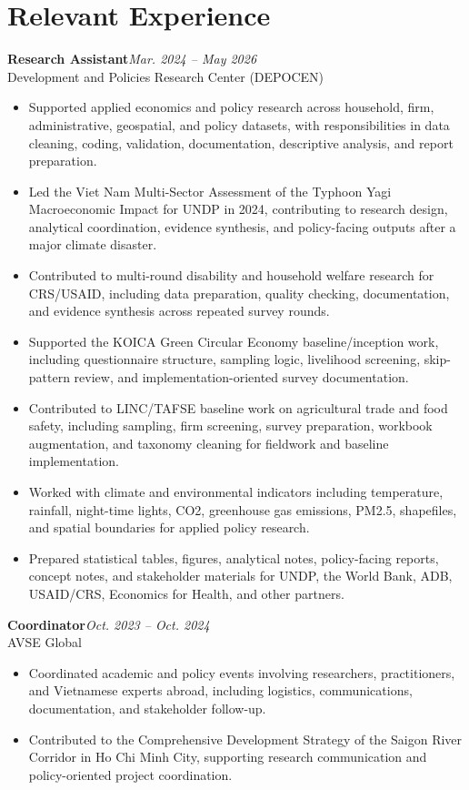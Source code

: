 \documentclass[10pt]{article}
\begin{document}
\section{Relevant Experience}
\textbf{Research Assistant}\hfill\emph{Mar. 2024 -- May 2026}\\
Development and Policies Research Center (DEPOCEN)
\begin{itemize}
\item Supported applied economics and policy research across household, firm, administrative, geospatial, and policy datasets, with responsibilities in data cleaning, coding, validation, documentation, descriptive analysis, and report preparation.
\item Led the Viet Nam Multi-Sector Assessment of the Typhoon Yagi Macroeconomic Impact for UNDP in 2024, contributing to research design, analytical coordination, evidence synthesis, and policy-facing outputs after a major climate disaster.
\item Contributed to multi-round disability and household welfare research for CRS/USAID, including data preparation, quality checking, documentation, and evidence synthesis across repeated survey rounds.
\item Supported the KOICA Green Circular Economy baseline/inception work, including questionnaire structure, sampling logic, livelihood screening, skip-pattern review, and implementation-oriented survey documentation.
\item Contributed to LINC/TAFSE baseline work on agricultural trade and food safety, including sampling, firm screening, survey preparation, workbook augmentation, and taxonomy cleaning for fieldwork and baseline implementation.
\item Worked with climate and environmental indicators including temperature, rainfall, night-time lights, CO2, greenhouse gas emissions, PM2.5, shapefiles, and spatial boundaries for applied policy research.
\item Prepared statistical tables, figures, analytical notes, policy-facing reports, concept notes, and stakeholder materials for UNDP, the World Bank, ADB, USAID/CRS, Economics for Health, and other partners.
\end{itemize}

\textbf{Coordinator}\hfill\emph{Oct. 2023 -- Oct. 2024}\\
AVSE Global
\begin{itemize}
\item Coordinated academic and policy events involving researchers, practitioners, and Vietnamese experts abroad, including logistics, communications, documentation, and stakeholder follow-up.
\item Contributed to the Comprehensive Development Strategy of the Saigon River Corridor in Ho Chi Minh City, supporting research communication and policy-oriented project coordination.
\end{itemize}
\end{document}
